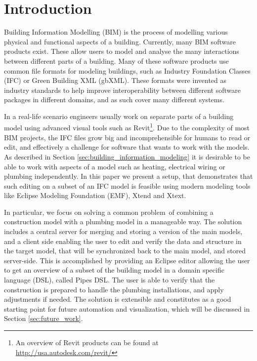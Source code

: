 


\setcounter{page}{1}
\section{Introduction}
Building Information Modelling (BIM) is the process of modelling various physical and functional aspects of a building. Currently, many BIM software products exist. These allow users to model and analyse the many interactions between different parts of a building. Many of these software products use common file formats for modeling buildings, such as Industry Foundation Classes (IFC) or Green Building XML (gbXML). These formats were invented as industry standards to help improve interoperability between different software packages in different domains, and as such cover many different systems.

In a real-life scenario engineers usually work on separate parts of a building model using advanced visual tools such as Revit\footnote{An overview of Revit products can be found at \url{http://usa.autodesk.com/revit/}}. Due to the complexity of most BIM projects, the IFC files grow big and incomprehensible for humans to read or edit, and effectively a challenge for software that wants to work with the models. As described in Section \ref{sec:building_information_modeling} it is desirable to be able to work with aspects of a model such as heating, electrical wiring or plumbing independently. In this paper we present a setup, that demonstrates that such editing on a subset of an IFC model is feasible using modern modeling tools like Eclipse Modeling Foundation (EMF), Xtend and Xtext.

In particular, we focus on solving a common problem\,\cite[pp. 20]{jorgensen10} of combining a construction model with a plumbing model in a manageable way. The solution includes a central server for merging and storing a version of the main models, and a client side enabling the user to edit and verify the data and structure in the target model, that will be synchronized back to the main model, and stored server-side. This is accomplished by providing an Eclipse editor allowing the user to get an overview of a subset of the building model in a domain specific language (DSL), called Pipes DSL. The user is able to verify that the construction is prepared to handle the plumbing installations, and apply adjustments if needed. The solution is extensible and constitutes as a good starting point for future automation and visualization, which will be discussed in Section \ref{sec:future_work}.

